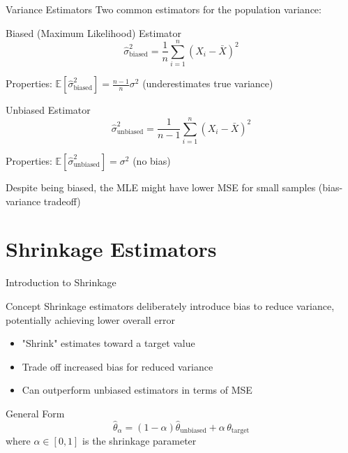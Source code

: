 \documentclass{beamer}
\begin{document}
\begin{frame}{Variance Estimators}
  Two common estimators for the population variance:
  
  \begin{block}{Biased (Maximum Likelihood) Estimator}
    \[
    \hat{\sigma}^2_{\text{biased}} = \frac{1}{n} \sum_{i=1}^n (X_i - \bar{X})^2
    \]
    
    Properties: $\mathbb{E}[\hat{\sigma}^2_{\text{biased}}] = \frac{n-1}{n} \sigma^2$ (underestimates true variance)
  \end{block}
  
  \begin{block}{Unbiased Estimator}
    \[
    \hat{\sigma}^2_{\text{unbiased}} = \frac{1}{n-1} \sum_{i=1}^n (X_i - \bar{X})^2
    \]
    
    Properties: $\mathbb{E}[\hat{\sigma}^2_{\text{unbiased}}] = \sigma^2$ (no bias)
  \end{block}
  
  Despite being biased, the MLE might have lower MSE for small samples (bias-variance tradeoff)
\end{frame}

\section{Shrinkage Estimators}

\begin{frame}{Introduction to Shrinkage}
  \begin{block}{Concept}
    Shrinkage estimators deliberately introduce bias to reduce variance, potentially achieving lower overall error
  \end{block}
  
  \begin{itemize}
    \item "Shrink" estimates toward a target value
    \item Trade off increased bias for reduced variance
    \item Can outperform unbiased estimators in terms of MSE
  \end{itemize}
  
  \begin{block}{General Form}
    \[
    \hat{\theta}_{\alpha} = (1-\alpha) \hat{\theta}_{\text{unbiased}} + \alpha \, \theta_{\text{target}}
    \]
    where $\alpha \in [0,1]$ is the shrinkage parameter
  \end{block}
\end{frame}
\end{document}
